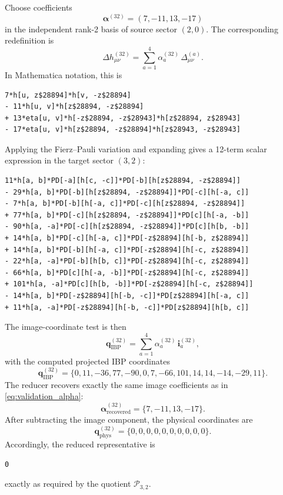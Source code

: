 \documentclass[11pt]{report}
\numberwithin{equation}{chapter}
\newcommand{\Pspace}[2]{\mathcal{P}_{#1,#2}}
\newcommand{\IBP}{\mathrm{IBP}}
\newcommand{\Phys}{\mathrm{phys}}
\begin{document}
Choose coefficients
\begin{equation}
  \bm{\alpha}^{(32)} = (7,-11,13,-17)
  \label{eq:validation_alpha}
\end{equation}
in the independent rank-2 basis of source sector \((2,0)\).
The corresponding redefinition is
\begin{equation}
  \Delta h_{\mu\nu}^{(32)}
  =
  \sum_{a=1}^{4}
  \alpha^{(32)}_{a}\,
  \Delta^{(a)}_{\mu\nu}.
  \label{eq:validation_delta}
\end{equation}
In Mathematica notation, this is
\begin{lstlisting}[style=mma]
7*h[u, z$28894]*h[v, -z$28894]
- 11*h[u, v]*h[z$28894, -z$28894]
+ 13*eta[u, v]*h[-z$28894, -z$28943]*h[z$28894, z$28943]
- 17*eta[u, v]*h[z$28894, -z$28894]*h[z$28943, -z$28943]
\end{lstlisting}

Applying the Fierz--Pauli variation and expanding gives a 12-term scalar expression in the target sector \((3,2)\):
\begin{lstlisting}[style=mma]
11*h[a, b]*PD[-a][h[c, -c]]*PD[-b][h[z$28894, -z$28894]]
- 29*h[a, b]*PD[-b][h[z$28894, -z$28894]]*PD[-c][h[-a, c]]
- 7*h[a, b]*PD[-b][h[-a, c]]*PD[-c][h[z$28894, -z$28894]]
+ 77*h[a, b]*PD[-c][h[z$28894, -z$28894]]*PD[c][h[-a, -b]]
- 90*h[a, -a]*PD[-c][h[z$28894, -z$28894]]*PD[c][h[b, -b]]
+ 14*h[a, b]*PD[-c][h[-a, c]]*PD[-z$28894][h[-b, z$28894]]
+ 14*h[a, b]*PD[-b][h[-a, c]]*PD[-z$28894][h[-c, z$28894]]
- 22*h[a, -a]*PD[-b][h[b, c]]*PD[-z$28894][h[-c, z$28894]]
- 66*h[a, b]*PD[c][h[-a, -b]]*PD[-z$28894][h[-c, z$28894]]
+ 101*h[a, -a]*PD[c][h[b, -b]]*PD[-z$28894][h[-c, z$28894]]
- 14*h[a, b]*PD[-z$28894][h[-b, -c]]*PD[z$28894][h[-a, c]]
+ 11*h[a, -a]*PD[-z$28894][h[-b, -c]]*PD[z$28894][h[b, c]]
\end{lstlisting}

The image-coordinate test is then
\begin{equation}
  \bm{q}^{(32)}_{\IBP}
  =
  \sum_{a=1}^{4} \alpha^{(32)}_{a}\,\bm{i}_{a}^{(32)},
  \label{eq:validation_image_decomposition}
\end{equation}
with the computed projected IBP coordinates
\begin{equation}
  \bm{q}^{(32)}_{\IBP}
  =
  \{0,11,-36,77,-90,0,7,-66,101,14,14,-14,-29,11\}.
  \label{eq:validation_ibp_coords}
\end{equation}
The reducer recovers exactly the same image coefficients as in \eqref{eq:validation_alpha}:
\begin{equation}
  \bm{\alpha}^{(32)}_{\mathrm{recovered}}
  =
  \{7,-11,13,-17\}.
  \label{eq:validation_recovered_alpha}
\end{equation}
After subtracting the image component, the physical coordinates are
\begin{equation}
  \bm{q}^{(32)}_{\Phys}
  =
  \{0,0,0,0,0,0,0,0,0,0\}.
  \label{eq:validation_zero_phys}
\end{equation}
Accordingly, the reduced representative is
\begin{lstlisting}[style=mma]
0
\end{lstlisting}
exactly as required by the quotient \(\Pspace{3}{2}\).
\end{document}
